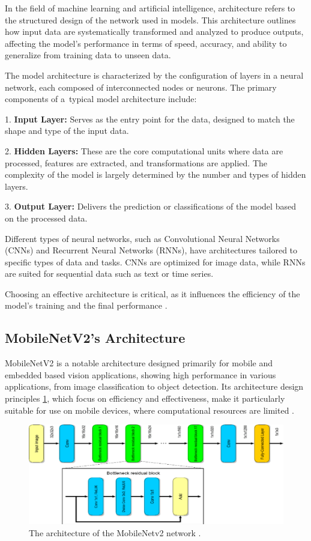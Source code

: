 In the field of machine learning and artificial intelligence, architecture refers to the structured design of the network used in models. This architecture outlines how input data are systematically transformed and analyzed to produce outputs, affecting the model's performance in terms of speed, accuracy, and ability to generalize from training data to unseen data.

The model architecture is characterized by the configuration of layers in a neural network, each composed of interconnected nodes or neurons. The primary components of a~typical model architecture include:

1. \textbf{Input Layer:} Serves as the entry point for the data, designed to match the shape and type of the input data.

2. \textbf{Hidden Layers:} These are the core computational units where data are processed, features are extracted, and transformations are applied. The complexity of the model is largely determined by the number and types of hidden layers.

3. \textbf{Output Layer:} Delivers the prediction or classifications of the model based on the processed data.

Different types of neural networks, such as Convolutional Neural Networks (CNNs) and Recurrent Neural Networks (RNNs), have architectures tailored to specific types of data and tasks. CNNs are optimized for image data, while RNNs are suited for sequential data such as text or time series.

Choosing an effective architecture is critical, as it influences the efficiency of the model's training and the final performance \cite{goodfellow2016deep}.

\subsection{MobileNetV2's Architecture}
MobileNetV2 is a notable architecture designed primarily for mobile and embedded based vision applications, showing high performance in various applications, from image classification to object detection. Its architecture design principles \ref{fig:Mobilnetv2Architecture}, which focus on efficiency and effectiveness, make it particularly suitable for use on mobile devices, where computational resources are limited \cite{mobilnetv2}.

\begin{figure}[h]
    \centering
    \includegraphics[width=1\textwidth]{obrazky-figures/mobilnetv2layers.png}
    \caption{The architecture of the MobileNetv2 network \cite{seidaliyeva2020layers}.}
    \label{fig:Mobilnetv2Architecture}
\end{figure}

